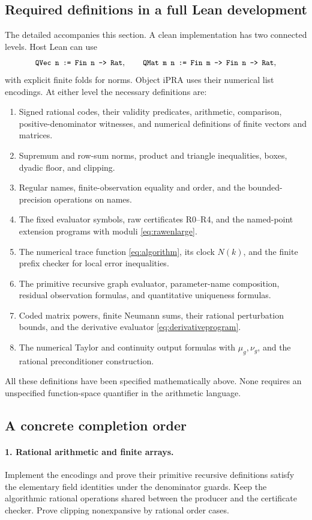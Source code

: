 \subsection{Required definitions in a full Lean development}

The detailed  accompanies this
section. A clean implementation has two connected levels.
Host Lean can use
\[
 \texttt{\small QVec n := Fin n -> Rat},\qquad
 \texttt{\small QMat m n := Fin m -> Fin n -> Rat},
\]
with explicit finite folds for norms. Object iPRA uses
their numerical list encodings. At either level the
necessary definitions are:
\begin{enumerate}
 \item Signed rational codes, their validity predicates,
 arithmetic, comparison, positive-denominator witnesses,
 and numerical definitions of finite vectors and matrices.
 \item Supremum and row-sum norms, product and triangle
 inequalities, boxes, dyadic floor, and clipping.
 \item Regular names, finite-observation equality and
 order, and the bounded-precision operations on names.
 \item The fixed evaluator symbols, raw certificates
 R0--R4, and the named-point extension programs with
 moduli \eqref{eq:rawenlarge}.
 \item The numerical trace function
 \eqref{eq:algorithm}, its clock \(N(k)\), and the finite
 prefix checker for local error inequalities.
 \item The primitive recursive graph evaluator,
 parameter-name composition, residual observation
 formulas, and quantitative uniqueness formulas.
 \item Coded matrix powers, finite Neumann sums, their
 rational perturbation bounds, and the derivative
 evaluator \eqref{eq:derivativeprogram}.
 \item The numerical Taylor and continuity output
 formulas with \(\mu_g,\nu_g\), and the rational
 preconditioner construction.
\end{enumerate}
All these definitions have been specified mathematically
above. None requires an unspecified function-space
quantifier in the arithmetic language.

\subsection{A concrete completion order}

\paragraph{1. Rational arithmetic and finite arrays.}
Implement the encodings and prove their primitive
recursive definitions satisfy the elementary field
identities under the denominator guards. Keep the
algorithmic rational operations shared between the
producer and the certificate checker. Prove clipping
nonexpansive by rational order cases.

